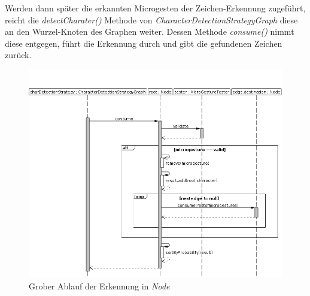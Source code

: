 Werden dann später die erkannten Microgesten der Zeichen-Erkennung zugeführt, reicht die \emph{detectCharater()} Methode von \emph{CharacterDetectionStrategyGraph} diese an den Wurzel-Knoten des Graphen weiter. Dessen Methode \emph{consume()} nimmt diese entgegen, führt die Erkennung durch und gibt die gefundenen Zeichen zurück.

\begin{figure}[h]
   \centering
   \includegraphics[width=\textwidth]{img/uml_sd_consume} 
   \caption{Grober Ablauf der Erkennung in \emph{Node}}
   \label{fig:sd_consume}
\end{figure}

